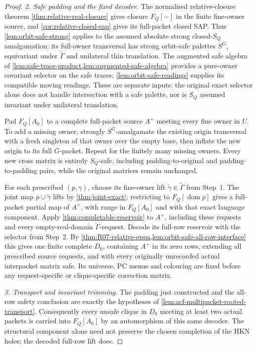 \begin{proof}
\medskip\noindent
\emph{2. Safe padding and the fixed decoder.}
The normalised relative-closure theorem
\cref{thm:relative-real-closure} gives closure \(F_Q[-]\) in
the finite fine-owner source, and \cref{cor:relative-closed-sap}
gives its full-packet closed SAP. Thus
\cref{lem:orbit-safe-strong} applies to the assumed absolute
strong closed-\(S_Q\) amalgamation: its full-owner transversal
has strong orbit-safe palettes \(S^G\), equivariant under
\(\widetilde\Gamma\) and unilateral thin translation.
The augmented safe algebra of
\cref{lem:safe-trace-product,lem:augmented-safe-algebra}
provides a pure-owner covariant selector on the safe traces;
\cref{lem:orbit-safe-readings} supplies its compatible moving
readings. These are separate inputs: the original exact selector
alone does not handle intersection with a safe palette, nor is
\(S_Q\) assumed invariant under unilateral translation.

Pad \(F_Q[A_0]\) to a complete full-packet source \(A^+\)
meeting every fine owner in \(U\). To add a missing owner,
strongly \(S^G\)-amalgamate the existing origin transversal
with a fresh singleton of that owner over the empty base,
then inflate the new origin to its full \(G\)-packet. Repeat
for the finitely many missing owners. Every new cross matrix
is entirely \(S_Q\)-safe, including padding-to-original and
padding-to-padding pairs, while the original matrices remain
unchanged.

For each prescribed \((p,\gamma)\), choose its fine-owner lift
\(\widetilde\gamma\in\widetilde\Gamma\) from Step~1.
The joint map \(p\cup\widetilde\gamma\) lifts by
\cref{thm:joint-exact}; restricting to \(F_Q[\operatorname{dom}p]\)
gives a full-packet partial map of \(A^+\), with range in
\(F_Q[A_0]\) and with that exact language component.
Apply \cref{thm:completable-reservoir} to \(A^+\), including
these requests and every empty-real-domain
\(\widetilde\Gamma\)-request. Decode its full-row reservoir
with the selector from Step~2. By
\cref{thm:R07-relative-eppa,lem:orbit-safe-all-row-interface}
this gives one finite complete \(D_0\), containing \(A^+\)
in its zero rows, extending all prescribed source requests,
and with every originally unrecorded actual interpacket matrix
safe. Its universe, PC menus and colouring are fixed before
any request-specific or clique-specific correction matrix.

\medskip\noindent
\emph{3. Transport and invariant trimming.}
The padding just constructed and the all-row safety conclusion
are exactly the hypotheses of
\cref{lem:acf-multipacket-rooted-transport}. Consequently every
unsafe clique in \(D_0\) meeting at least two actual packets is
carried into \(F_Q[A_0]\) by an automorphism of this same decoder.
The structural component alone need not preserve the chosen
completion of the HKN holes; the decoded full-row lift does.


\end{proof}
